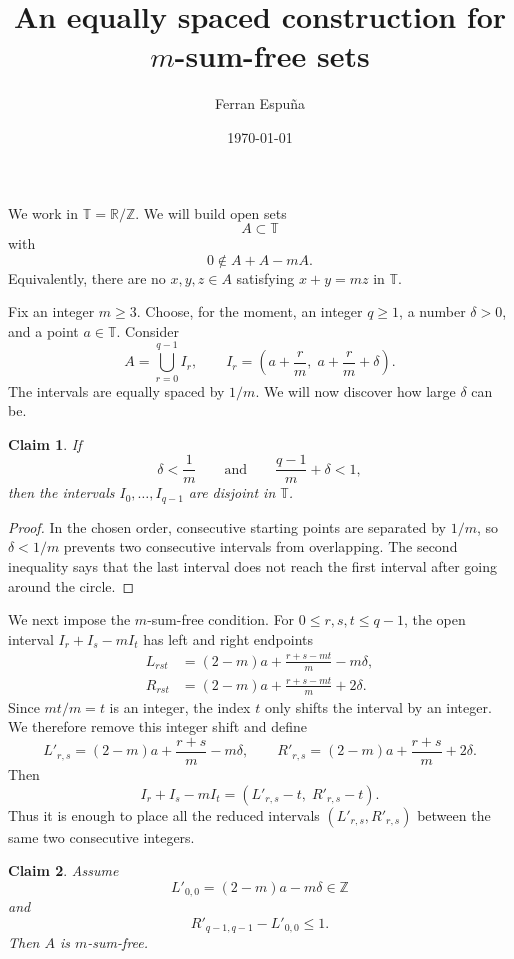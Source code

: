 \documentclass{article}
\title{An equally spaced construction for $m$-sum-free sets}
\author{Ferran Espu\~na}
\date{\today}
\newtheorem{claim}{Claim}
\begin{document}
\maketitle
\fi

We work in \(\mathbb T=\mathbb R/\mathbb Z\). We will build open sets
\[
    A\subset \mathbb T
\]
with
\[
    0\notin A+A-mA.
\]
Equivalently, there are no \(x,y,z\in A\) satisfying \(x+y=mz\) in
\(\mathbb T\).

Fix an integer \(m\geq 3\). Choose, for the moment, an integer \(q\geq 1\), a
number \(\delta>0\), and a point \(a\in\mathbb T\). Consider
\[
    A=\bigcup_{r=0}^{q-1} I_r,
    \qquad
    I_r=\left(a+\frac r m,\; a+\frac r m+\delta\right).
\]
The intervals are equally spaced by \(1/m\). We will now discover how large
\(\delta\) can be.

\begin{claim}\label{claim:disjoint}
If
\[
    \delta<\frac1m
    \qquad\text{and}\qquad
    \frac{q-1}{m}+\delta<1,
\]
then the intervals \(I_0,\ldots,I_{q-1}\) are disjoint in \(\mathbb T\).
\end{claim}

\begin{proof}
In the chosen order, consecutive starting points are separated by \(1/m\), so
\(\delta<1/m\) prevents two consecutive intervals from overlapping. The second
inequality says that the last interval does not reach the first interval after
going around the circle.
\end{proof}

We next impose the \(m\)-sum-free condition. For \(0\leq r,s,t\leq q-1\), the
open interval \(I_r+I_s-mI_t\) has left and right endpoints
\begin{align*}
    L_{rst}
    &=
    (2-m)a+\frac{r+s-mt}{m}-m\delta, \\
    R_{rst}
    &=
    (2-m)a+\frac{r+s-mt}{m}+2\delta.
\end{align*}
Since \(mt/m=t\) is an integer, the index \(t\) only shifts the interval by an
integer. We therefore remove this integer shift and define
\[
    L'_{r,s}=(2-m)a+\frac{r+s}{m}-m\delta,
    \qquad
    R'_{r,s}=(2-m)a+\frac{r+s}{m}+2\delta.
\]
Then
\[
    I_r+I_s-mI_t=(L'_{r,s}-t,\; R'_{r,s}-t).
\]
Thus it is enough to place all the reduced intervals
\((L'_{r,s},R'_{r,s})\) between the same two consecutive integers.

\begin{claim}\label{claim:reduced_intervals}
Assume
\[
    L'_{0,0}=(2-m)a-m\delta\in\mathbb Z
\]
and
\[
    R'_{q-1,q-1}-L'_{0,0}\leq 1.
\]
Then \(A\) is \(m\)-sum-free.
\end{claim}
\end{document}
